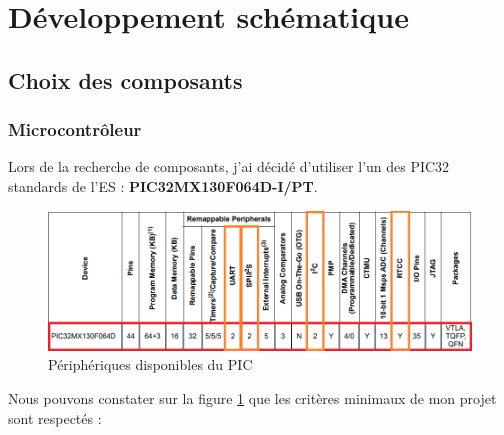 \section{Développement schématique}

\subsection{Choix des composants} \label{ssec:num32}
{
	\subsubsection{Microcontrôleur}
	Lors de la recherche de composants, j'ai décidé d'utiliser l'un des PIC32 standards de l'ES :
	\textbf{PIC32MX130F064D-I/PT}.
		
	\begin{figure}[h]
		\centering
		\includegraphics[width=1\linewidth]{Figures/Dev-SCH/PIC32-choisi}
		\caption{Périphériques disponibles du PIC}
		\label{fig:pic32-choisi}
	\end{figure}
	
	Nous pouvons constater sur la figure \ref{fig:pic32-choisi} que les critères minimaux de mon projet sont respectés :
	
	\begin{center}
		   
	\end{center}
}

\clearpage
